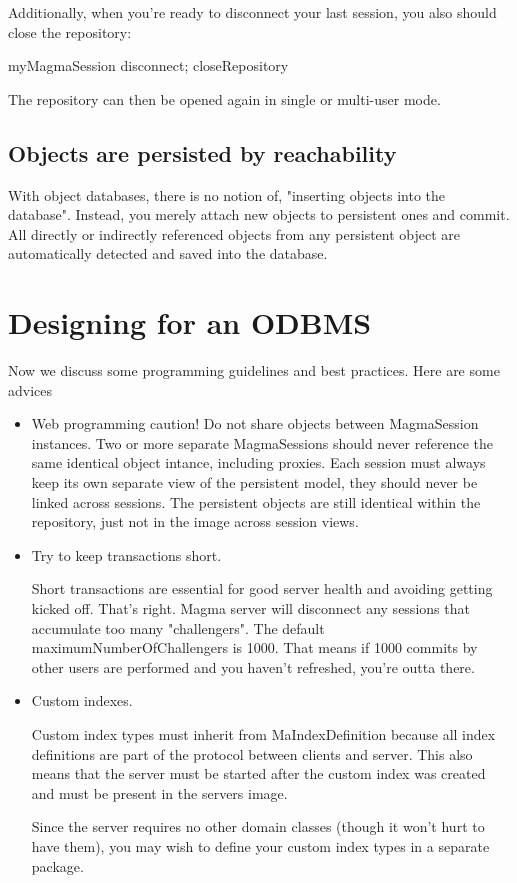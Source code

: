 \documentclass[a4paper,10pt,twoside]{book}
\begin{document}
Additionally, when you're ready to disconnect your last session, you also should close the repository:

\begin{code}{}
	myMagmaSession disconnect; closeRepository
\end{code}

The repository can then be opened again in single or multi-user mode.


\subsection{Objects are persisted by reachability}

With object databases, there is no notion of, "inserting objects into the database". Instead, you merely attach new objects to persistent ones and commit. All directly or indirectly referenced objects from any persistent object are automatically detected and saved into the database.

\section{Designing for an ODBMS}
Now we discuss some programming guidelines and best practices.
Here are some advices

\begin{itemize}
	\item Web programming caution!
	Do not share objects between MagmaSession instances. Two or more separate MagmaSessions should never reference the same identical object intance, including proxies. Each session must always keep its own separate view of the persistent model, they should never be linked across sessions. The persistent objects are still identical within the repository, just not in the image across session views.

\item Try to keep transactions short.

Short transactions are essential for good server health and avoiding getting kicked off. That's right. Magma server will disconnect any sessions that accumulate too many "challengers". The default maximumNumberOfChallengers is 1000. That means if 1000 commits by other users are performed and you haven't refreshed, you're outta there.

\item Custom indexes.

Custom index types must inherit from MaIndexDefinition because all index definitions are part of the protocol between clients and server. This also means that the server must be started after the custom index was created and must be present in the servers image.

Since the server requires no other domain classes (though it won't hurt to have them), you may wish to define your custom index types in a separate package.

\end{itemize}
\end{document}
